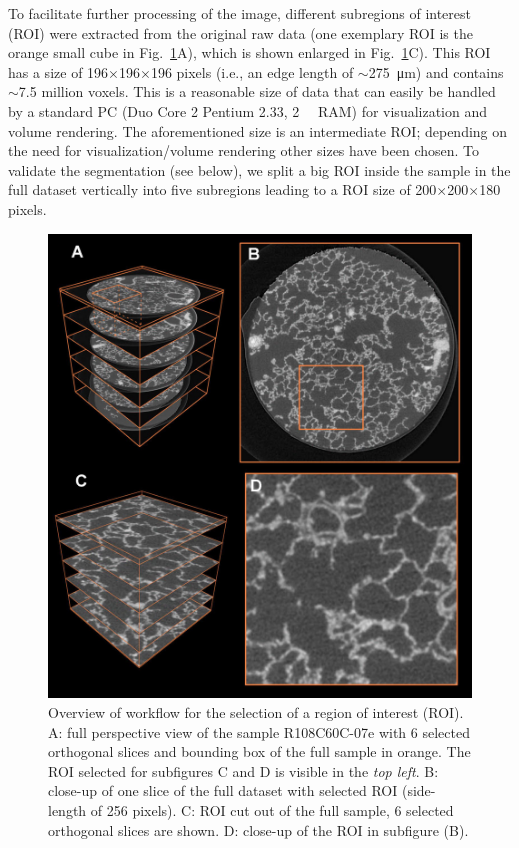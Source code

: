 To facilitate further processing of the image, different subregions of interest (ROI) were extracted from the original raw data (one exemplary ROI is the orange small cube in Fig.~\ref{fig:srxtm}A), which is shown enlarged in Fig.~\ref{fig:srxtm}C). This ROI has a size of 196$\times$196$\times$196 pixels (i.e., an edge length of $\sim$\SI{275}{\micro\meter}) and contains $\sim$7.5 million voxels. This is a reasonable size of data that can easily be handled by a standard PC (Duo Core 2 Pentium \SI{2.33}{\gigahertz}, \SI{2}{\giga\byte} RAM) for visualization and volume rendering. The aforementioned size is an intermediate ROI; depending on the need for visualization/volume rendering other sizes have been chosen. To validate the segmentation (see below), we split a big ROI inside the sample in the full dataset vertically into five subregions leading to a ROI size of 200$\times$200$\times$180 pixels.

\renewcommand{\imsize}{\linewidth}
\begin{figure}[p]
	\centering
	\includegraphics[width=\imsize]{img/Tsuda2008/Tsuda-05}
	\caption{Overview of workflow for the selection of a region of interest (ROI). A: full perspective view of the sample R108C60C-07e with 6 selected orthogonal slices and
bounding box of the full sample in orange. The ROI selected for subfigures C and D is
visible in the \textit{top left}. B: close-up of one slice of the full dataset with selected ROI (side-length of 256 pixels). C: ROI cut out of the full sample, 6 selected orthogonal slices are shown. D: close-up of the ROI in subfigure (B).}
	\label{fig:srxtm}
\end{figure}

